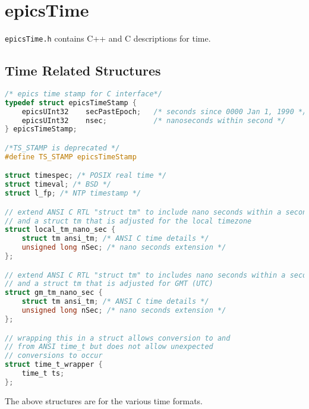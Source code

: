 \section{epicsTime}

\verb|epicsTime.h| contains C++ and C descriptions for time.

\subsection{Time Related Structures}

\begin{lstlisting}[language=C]
/* epics time stamp for C interface*/
typedef struct epicsTimeStamp {
    epicsUInt32    secPastEpoch;   /* seconds since 0000 Jan 1, 1990 */
    epicsUInt32    nsec;           /* nanoseconds within second */
} epicsTimeStamp;

/*TS_STAMP is deprecated */
#define TS_STAMP epicsTimeStamp

struct timespec; /* POSIX real time */
struct timeval; /* BSD */
struct l_fp; /* NTP timestamp */

// extend ANSI C RTL "struct tm" to include nano seconds within a second
// and a struct tm that is adjusted for the local timezone
struct local_tm_nano_sec {
    struct tm ansi_tm; /* ANSI C time details */
    unsigned long nSec; /* nano seconds extension */
};

// extend ANSI C RTL "struct tm" to includes nano seconds within a second
// and a struct tm that is adjusted for GMT (UTC)
struct gm_tm_nano_sec {
    struct tm ansi_tm; /* ANSI C time details */
    unsigned long nSec; /* nano seconds extension */
};

// wrapping this in a struct allows conversion to and
// from ANSI time_t but does not allow unexpected
// conversions to occur
struct time_t_wrapper {
    time_t ts;
};
\end{lstlisting}


The above structures are for the various time formats.

